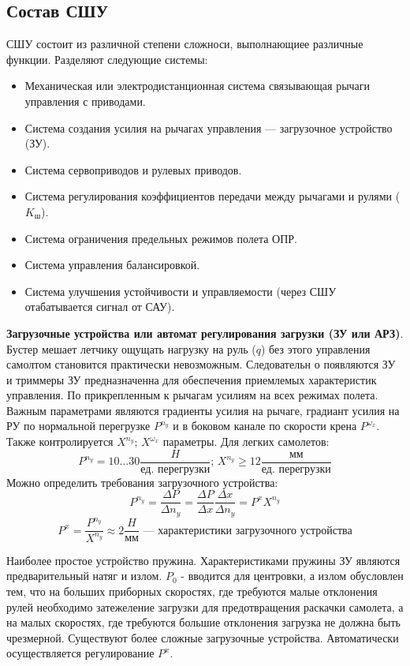 \documentclass{article}
\begin{document}
\subsection{Состав СШУ}
СШУ состоит из различной степени сложноси, выполнающиее различные функции. Разделяют следующие системы:
\begin{itemize}
	\item Механическая или электродистанционная система связывающая рычаги управления с приводами.
	\item Система создания усилия на рычагах управления --- загрузочное устройство (ЗУ).
	\item Система сервоприводов и рулевых приводов.
	\item Система регулирования коэффициентов передачи между рычагами и рулями ($K_\text{ш}$).
	\item Система ограничения предельных режимов полета ОПР.
	\item Система управления балансировкой.
	\item Система улучшения устойчивости и управляемости (через СШУ отабатывается сигнал от САУ).
\end{itemize}
\textbf{Загрузочные устройства или автомат регулирования загрузки (ЗУ или АРЗ)}. Бустер мешает летчику ощущать нагрузку на руль ($q$) без этого управления самолтом становится практически невозможным. Следовательн  о появляются ЗУ и триммеры 
ЗУ предназначенна для обеспечения приемлемых характеристик управления. По прикрепленным к рычагам усилиям на всех режимах полета. Важным параметрами являются градиенты усилия на рычаге, градиант усилия на РУ по нормальной перегрузке $P^{n_y}$ и в боковом канале по скорости крена $P^{\omega_x}$. Также контролируется $X^{n_y}; \, X^{\omega_x}$ параметры. Для легких самолетов:
\[
	P^{n_y} =10 \dots 30 \frac{H}{\text{ед. перегрузки}}; \, X^{n_y} \ge 12 \frac{\text{мм}}{\text{ед. перегрузки}}
\]
Можно определить требования загрузочного устройства:
\[
	P^{n_y} = \frac{\Delta P}{\Delta n_y} = \frac{\Delta P}{\Delta x} \frac{\Delta x}{\Delta n_y} = P^{x} X^{n_y}
\]
\[
	P^{x} = \frac{P^{n_y}}{X^{n_y}} \approx 2 \frac{H}{\text{мм}} \text{ --- характеристики загрузочного устройства}
\]

Наиболее простое устройство пружина.
Характеристиками пружины ЗУ являются предварительный натяг и излом. $P_0$ - вводится для центровки, а излом обусловлен тем, что на больших приборных скоростях, где требуются малые отклонения рулей необходимо затежеление загрузки для предотвращения раскачки самолета, а на малых скоростях, где требуются большие отклонения загрузка не должна быть чрезмерной. Существуют более сложные загрузочные устройства. Автоматически осуществляется регулирование $P^{x}$. 
\end{document}
